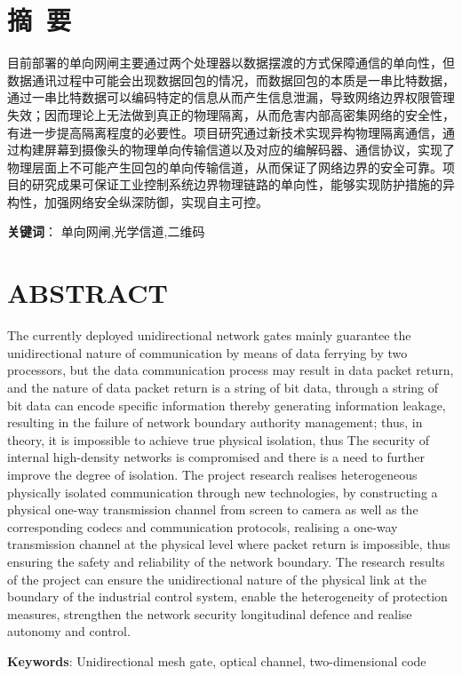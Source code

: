 \newpage

{
\let\clearpage\relax%
\centering{}

\vspace{8mm}

\chapter*{摘\ 要}
}

目前部署的单向网闸主要通过两个处理器以数据摆渡的方式保障通信的单向性，但数据通讯过程中可能会出现数据回包的情况，而数据回包的本质是一串比特数据，通过一串比特数据可以编码特定的信息从而产生信息泄漏，导致网络边界权限管理失效；因而理论上无法做到真正的物理隔离，从而危害内部高密集网络的安全性，有进一步提高隔离程度的必要性。项目研究通过新技术实现异构物理隔离通信，通过构建屏幕到摄像头的物理单向传输信道以及对应的编解码器、通信协议，实现了物理层面上不可能产生回包的单向传输信道，从而保证了网络边界的安全可靠。项目的研究成果可保证工业控制系统边界物理链路的单向性，能够实现防护措施的异构性，加强网络安全纵深防御，实现自主可控。

\vspace{8mm}
\textbf{关键词}： 单向网闸,光学信道,二维码

\newpage
{
\let\clearpage\relax%
\centering{}
\vspace{8mm}

\chapter*{ABSTRACT}
}

The currently deployed unidirectional network gates mainly guarantee the unidirectional nature of communication by means of data ferrying by two processors, but the data communication process may result in data packet return, and the nature of data packet return is a string of bit data, through a string of bit data can encode specific information thereby generating information leakage, resulting in the failure of network boundary authority management; thus, in theory, it is impossible to achieve true physical isolation, thus The security of internal high-density networks is compromised and there is a need to further improve the degree of isolation. The project research realises heterogeneous physically isolated communication through new technologies, by constructing a physical one-way transmission channel from screen to camera as well as the corresponding codecs and communication protocols, realising a one-way transmission channel at the physical level where packet return is impossible, thus ensuring the safety and reliability of the network boundary. The research results of the project can ensure the unidirectional nature of the physical link at the boundary of the industrial control system, enable the heterogeneity of protection measures, strengthen the network security longitudinal defence and realise autonomy and control.

\vspace{8mm}

\textbf{Keywords}: Unidirectional mesh gate, optical channel, two-dimensional code